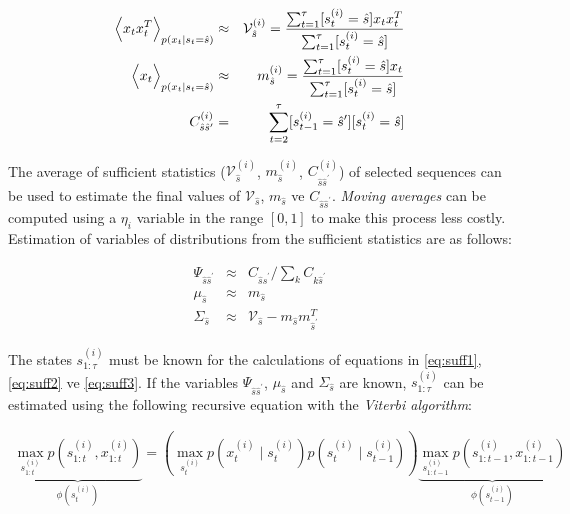 {\small
    \begin{eqnarray}
    \Bigl< x_t x_t^T \Bigr>_{p(x_t \mid s_t = \hat{s})} &\approx& \mathcal{V}_{\hat{s}}^{(i)} = \frac{\sum_{t=1}^\tau [s^{(i)}_t = \hat{s}]  x_t x_t^T}{\sum_{t=1}^\tau [s^{(i)}_t = \hat{s}]} \label{eq:suff1}\\
    \Bigl< x_t \Bigr>_{p(x_t \mid s_t = \hat{s})} &\approx& m_{\hat{s}}^{(i)} = \frac{\sum_{t=1}^\tau [s^{(i)}_t = \hat{s}]  x_t }{\sum_{t=1}^\tau [s^{(i)}_t = \hat{s}]}\label{eq:suff2} \\
    C^{(i)}_{\hat{s}\hat{s}^{\prime}} & = & \sum_{t=2}^{\tau} [s^{(i)}_{t-1} = \hat{s}^{\prime}][s^{(i)}_{t} = \hat{s}] \label{eq:suff3}
    \end{eqnarray}
}

The average of sufficient statistics ($\mathcal{V}_{\hat{s}}^{(i)}$, $m_{\hat{s}}^{(i)}$, $C^{(i)}_{\hat{s}\hat{s}^{\prime}}$) of selected sequences can be used to estimate the final values of $\mathcal{V}_{\hat{s}}$, $m_{\hat{s}}$ ve $C_{\hat{s}\hat{s}^{\prime}}$. \textit{Moving averages} can be computed using a $\eta_i$ variable in the range $[0,1]$ to make this process less costly. Estimation of variables of distributions from the sufficient statistics are as follows:

\begin{eqnarray}
\Psi_{\hat{s}\hat{s}^{\prime}} & \approx & C_{\hat{s}\hat{s}^{\prime}}/\sum_k C_{k\hat{s}^{\prime}}  \\
\mu_{\hat{s}} & \approx & m_{\hat{s}}  \\
\Sigma_{\hat{s}} & \approx & \mathcal{V}_{\hat{s}} - m_{\hat{s}} m_{\hat{s}^{\prime}}^T
\end{eqnarray}

The states $s^{(i)}_{1:\tau}$ must be known for the calculations of equations in \ref{eq:suff1}, \ref{eq:suff2} ve \ref{eq:suff3}. If the variables $\Psi_{\hat{s}\hat{s}^{\prime}}$, $\mu_{\hat{s}}$ and $\Sigma_{\hat{s}}$ are known, $s^{(i)}_{1:\tau}$ can be estimated using the following recursive equation with the \textit{Viterbi algorithm}:

\begin{eqnarray}
    \underbrace{\max _{s_{1 : t}^{(i)}} p\left(s_{1 : t}^{(i)}, x_{1 : t}^{(i)}\right)}_{\phi \left(s_{t}^{(i)}\right)}=
    \left(\max _{s_{t}^{(i)}}p\left(x_{t}^{(i)} \mid s_{t}^{(i)}\right) p\left(s_{t}^{(i)} \mid s_{t-1}^{(i)}\right) \right)
    \underbrace{\max _{s_{1 : t-1}^{(i)}} p\left(s_{1 : t-1}^{(i)}, x_{1 : t-1}^{(i)}\right)}_{\phi \left(s_{t-1}^{(i)}\right)}
\end{eqnarray}

